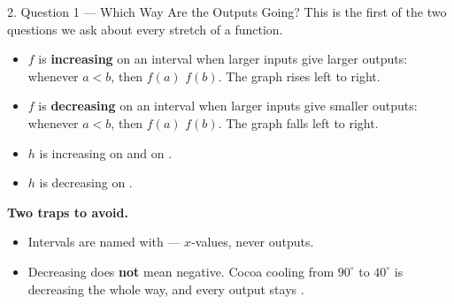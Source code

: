 \documentclass[10pt]{article}
\begin{document}
\boxguard[27]
\begin{notesbox}{2. Question 1 --- Which Way Are the Outputs Going?}
This is the first of the two questions we ask about every stretch of a
function.

\begin{itemize}[itemsep=4pt]
  \item $f$ is \textbf{increasing} on an interval when larger inputs give
        larger outputs: whenever $a < b$, then $f(a)$ \blank{1cm} $f(b)$.
        The graph rises left to right.
  \item $f$ is \textbf{decreasing} on an interval when larger inputs give
        smaller outputs: whenever $a < b$, then $f(a)$ \blank{1cm} $f(b)$.
        The graph falls left to right.
\end{itemize}

\begin{center}
\end{center}

\begin{itemize}[itemsep=4pt]
  \item $h$ is increasing on \blank{2.6cm} and on \blank{2.6cm}.
  \item $h$ is decreasing on \blank{2.6cm}.
\end{itemize}

\textbf{Two traps to avoid.}
\begin{itemize}[itemsep=4pt]
  \item Intervals are named with \blank{2.2cm} --- $x$-values, never outputs.
  \item Decreasing does \textbf{not} mean negative. Cocoa cooling from
        $90^\circ$ to $40^\circ$ is decreasing the whole way, and every
        output stays \blank{2.2cm}.
\end{itemize}
\end{notesbox}
\end{document}
